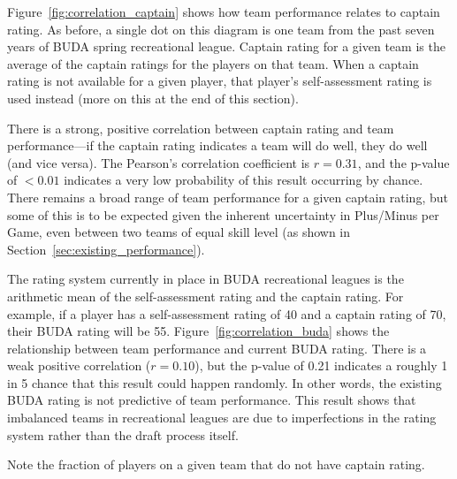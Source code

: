 Figure~\ref{fig:correlation_captain} shows how team performance relates to captain rating.  As before, a single dot on this diagram is one team from the past seven years of BUDA spring recreational league.  Captain rating for a given team is the average of the captain ratings for the players on that team. When a captain rating is not available for a given player, that player's self-assessment rating is used instead (more on this at the end of this section).

There is a strong, positive correlation between captain rating and team performance---if the captain rating indicates a team will do well, they do well (and vice versa). The Pearson's correlation coefficient is $r = 0.31$, and the p-value of $<0.01$ indicates a very low probability of this result occurring by chance. There remains a broad range of team performance for a given captain rating, but some of this is to be expected given the inherent uncertainty in Plus/Minus per Game, even between two teams of equal skill level (as shown in Section~\ref{sec:existing_performance}).

The rating system currently in place in BUDA recreational leagues is the arithmetic mean of the self-assessment rating and the captain rating.  For example, if a player has a self-assessment rating of 40 and a captain rating of 70, their BUDA rating will be 55. Figure~\ref{fig:correlation_buda} shows the relationship between team performance and current BUDA rating. There is a weak positive correlation ($r = 0.10$), but the p-value of 0.21 indicates a roughly 1 in 5 chance that this result could happen randomly.  In other words, the existing BUDA rating is not predictive of team performance. This result shows that imbalanced teams in recreational leagues are due to imperfections in the rating system rather than the draft process itself.

Note the fraction of players on a given team that do not have captain rating.
